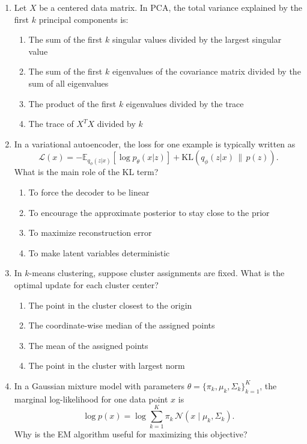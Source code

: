 \documentclass[11pt]{article}
\newcommand{\cmark}{\ding{51}}
\begin{document}
\begin{enumerate}[leftmargin=*]
\item Let $X$ be a centered data matrix. In PCA, the total variance explained by the first $k$ principal components is:

\begin{enumerate}[label=\Alph*.]
    \item The sum of the first $k$ singular values divided by the largest singular value
    \item The sum of the first $k$ eigenvalues of the covariance matrix divided by the sum of all eigenvalues \cmark
    \item The product of the first $k$ eigenvalues divided by the trace
    \item The trace of $X^T X$ divided by $k$
\end{enumerate}

\item In a variational autoencoder, the loss for one example is typically written as
\[
\mathcal{L}(x)= -\mathbb{E}_{q_\phi(z|x)}[\log p_\theta(x|z)] + \mathrm{KL}(q_\phi(z|x)\,\|\,p(z)).
\]
What is the main role of the KL term?

\begin{enumerate}[label=\Alph*.]
    \item To force the decoder to be linear
    \item To encourage the approximate posterior to stay close to the prior \cmark
    \item To maximize reconstruction error
    \item To make latent variables deterministic
\end{enumerate}

\item In $k$-means clustering, suppose cluster assignments are fixed. What is the optimal update for each cluster center?

\begin{enumerate}[label=\Alph*.]
    \item The point in the cluster closest to the origin
    \item The coordinate-wise median of the assigned points
    \item The mean of the assigned points \cmark
    \item The point in the cluster with largest norm
\end{enumerate}

\item In a Gaussian mixture model with parameters $\theta = \{\pi_k, \mu_k, \Sigma_k\}_{k=1}^K$, the marginal log-likelihood for one data point $x$ is
\[
\log p(x) = \log \sum_{k=1}^K \pi_k \, \mathcal{N}(x \mid \mu_k, \Sigma_k).
\]
Why is the EM algorithm useful for maximizing this objective?


\end{enumerate}
\end{document}
